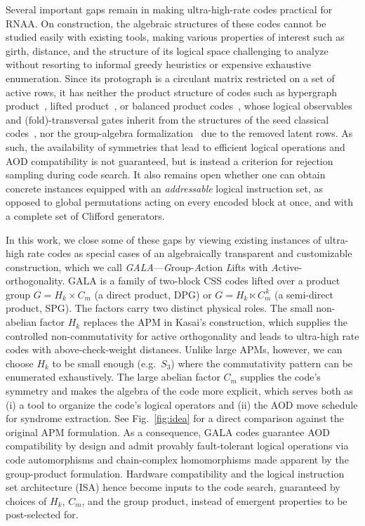 \documentclass[amsmath,amssymb,twocolumn,aps,prl,superscriptaddress,nofootinbib]{revtex4-2}
\theoremstyle{definition}
\begin{document}
Several important gaps remain in making ultra-high-rate codes practical for RNAA.  On construction, the algebraic structures of these codes cannot be studied easily with existing tools, making various properties of interest such as girth, distance, and the structure of its logical space challenging to analyze without resorting to informal greedy heuristics or expensive exhaustive enumeration. Since its protograph is a circulant matrix restricted on a set of active rows, it has neither the product structure of codes such as hypergraph product~\cite{tillich2014quantum}, lifted product~\cite{panteleev2021degenerate}, or balanced product codes~\cite{breuckmann2021balanced}, whose logical observables and (fold)-transversal gates inherit from the structures of the seed classical codes~\cite{Quintavalle_2023,berthusen2025automorphismgadgetshomologicalproduct}, nor the group-algebra formalization~\cite{panteleev2021degenerate} due to the removed latent rows. As such, the availability of symmetries that lead to efficient logical operations and AOD compatibility is not guaranteed, but is instead a criterion for rejection sampling during code search. It also remains open whether one can obtain concrete instances equipped with an \emph{addressable} logical instruction set, as opposed to global permutations acting on every encoded block at once, and with a complete set of Clifford generators.

In this work, we close some of these gaps by viewing existing instances of ultra-high rate codes as special cases of an algebraically transparent and customizable construction, which we call \emph{GALA}---\textit{G}roup-\textit{A}ction \textit{L}ifts with \textit{A}ctive-orthogonality. GALA is a family of two-block CSS codes lifted over a product group $G=H_k\times C_m$ (a direct product, DPG) or $G=H_k\ltimes C_m^{\,k}$ (a semi-direct product, SPG). The factors carry two distinct physical roles. The small non-abelian factor $H_k$ replaces the APM in Kasai's construction, which supplies the controlled non-commutativity for active orthogonality and leads to ultra-high rate codes with above-check-weight distances. Unlike large APMs, however, we can choose $H_k$ to be small enough (e.g.\ $S_3$) where the commutativity pattern can be enumerated exhaustively. The large abelian factor $C_m$ supplies the code's symmetry and makes the algebra of the code more explicit, which serves both as (i) a tool to organize the code's logical operators and (ii) the AOD move schedule for syndrome extraction. See Fig.~\ref{fig:idea} for a direct comparison against the original APM formulation. As a consequence, GALA codes guarantee AOD compatibility by design and admit provably fault-tolerant logical operations via code automorphisms and chain-complex homomorphisms made apparent by the group-product formulation. Hardware compatibility and the logical instruction set architecture (ISA) hence become inputs to the code search, guaranteed by choices of $H_k$, $C_m$, and the group product, instead of emergent properties to be post-selected for. 
\end{document}
